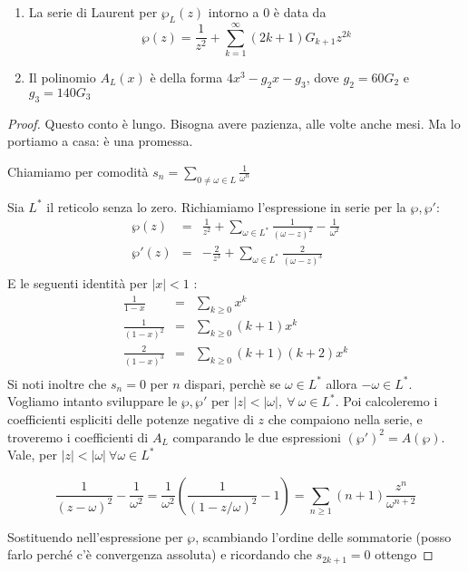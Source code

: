 \begin{teorema}$ $
    \begin{enumerate}
        \item La serie di Laurent per $\wp_L(z)$ intorno a $0$ è data da $$ \wp(z)= \frac1{z^2}+\sum_{k=1}^\infty (2k+1)G_{k+1}z^{2k}$$
        \item Il polinomio $A_L(x)$ è della forma $4x^3-g_2x-g_3$, dove $g_2=60G_2$ e $g_3=140G_3$
    \end{enumerate}
\end{teorema}
\begin{proof}
    Questo conto è lungo. Bisogna avere pazienza, alle volte anche mesi. Ma lo portiamo a casa: è una promessa.

    Chiamiamo per comodità $\displaystyle s_n = \sum_{0 \neq \omega \in L} \frac{1}{\omega^n} $

    Sia $L^*$ il reticolo senza lo zero. Richiamiamo l'espressione in serie per la $\wp, \wp'$:
    \begin{eqnarray*}
    \wp(z) & = & \frac{1}{z^2} + \sum_{\omega \in L^*} \frac{1}{(\omega-z)^2} -\frac{1}{\omega^2} \\
    \wp'(z) & = & -\frac{2}{z^3} + \sum_{\omega \in L^*} \frac{2}{(\omega-z)^3} \\
    \end{eqnarray*}
    E le seguenti identità per $|x| < 1$ :
    \begin{eqnarray*}
    \frac{1}{1-x} & = & \sum_{k \ge 0} x^k \\
    \frac{1}{(1-x)^2} & = & \sum_{k \ge 0} (k+1)x^k \\
    \frac{2}{(1-x)^3} & = & \sum_{k \ge 0} (k+1)(k+2) x^k \\
    \end{eqnarray*}
    Si noti inoltre che $s_n=0$ per $n$ dispari, perchè se $\omega \in L^*$ allora $-\omega \in L^*$.
    Vogliamo intanto sviluppare le $\wp, \wp'$ per $|z| < |\omega|, \ \forall \ \omega \in L^*$. Poi calcoleremo i coefficienti espliciti delle potenze negative di $z$ che compaiono nella serie, e troveremo i coefficienti di $A_L$ comparando le due espressioni $(\wp')^2 = A(\wp)$.
    Vale, per $|z| < |\omega| \ \forall \omega \in L^*$

    $$ \frac1{(z-\omega)^2}-\frac1{\omega^2} = \frac1{\omega^2}\left( \frac1{(1-z/\omega)^2}-1 \right) = \sum_{n\ge1}(n+1)\frac{z^n}{\omega^{n+2}}$$

    Sostituendo nell'espressione per $\wp$, scambiando l'ordine delle sommatorie (posso farlo perché c'è convergenza assoluta) e ricordando che $s_{2k+1}=0$ ottengo


\end{proof}
